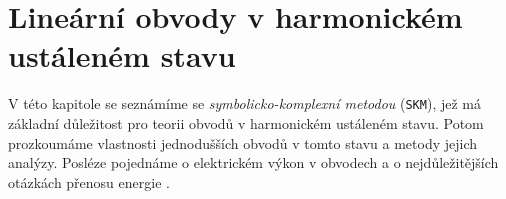 {
\chapter[Harmonické obvody]{Lineární obvody v harmonickém ustáleném stavu}
\minitoc

  V této kapitole se seznámíme se \emph{symbolicko-komplexní metodou} (\texttt{SKM}), jež má
  základní důležitost pro teorii obvodů v harmonickém ustáleném stavu. Potom prozkoumáme vlastnosti
  jednodušších obvodů v tomto stavu a metody jejich analýzy. Posléze pojednáme o elektrickém výkon
  v obvodech a o nejdůležitějších otázkách přenosu energie \cite[s.~60]{Mayer1975}.
  
}
